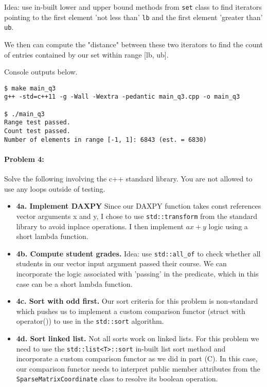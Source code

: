 \documentclass[12pt,letterpaper,twoside]{article}
\begin{document}
Idea: use in-built lower and upper bound methods from \texttt{set}
class to find iterators pointing to the first element 'not less than'
\texttt{lb} and the first element 'greater than' \texttt{ub}. 

We then can compute the "distance" between these two iterators to
find the count of entries contained by our set within range [lb, ub].

Console outputs below.
\begin{verbatim}
$ make main_q3
g++ -std=c++11 -g -Wall -Wextra -pedantic main_q3.cpp -o main_q3

$ ./main_q3
Range test passed.
Count test passed.
Number of elements in range [-1, 1]: 6843 (est. = 6830)
\end{verbatim}


\paragraph{Problem 4: } Solve the following involving the c++ standard
library. You are not allowed to use any loops outside of testing.

\begin{itemize}
    \item \textbf{4a. Implement DAXPY} Since our DAXPY function takes
    const references vector arguments x and y, I chose to use 
    \texttt{std::transform} from the standard library to avoid
    inplace operations. I then implement $ax + y$ logic using a 
    short lambda function.

    \item \textbf{4b. Compute student grades.} Idea: use \texttt{std::all\_of}
    to check whether all students in our vector input argument passed
    their course. We can incorporate the logic associated with 'passing'
    in the predicate, which in this case can be a short lambda function.

    \item \textbf{4c. Sort with odd first.} Our sort criteria for this problem 
    is non-standard which pushes us to implement a custom comparison 
    functor (struct with operator()) to use in the \texttt{std::sort}
    algorithm.

    \item \textbf{4d. Sort linked list.} Not all sorts work on linked lists.
    For this problem we need to use the \texttt{std::list<T>::sort} in-built
    list sort method and incorporate a custom comparison functor as we did
    in part (C). In this case, our comparison functor needs to interpret 
    public member attributes from the \texttt{SparseMatrixCoordinate} 
    class to resolve its boolean operation.

\end{itemize}
\end{document}
